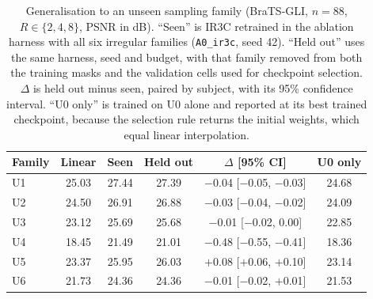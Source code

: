 \begin{table}[pos=t]
\caption{Generalisation to an unseen sampling family (BraTS-GLI, $n=88$, $R\in\{2,4,8\}$, PSNR in dB). ``Seen'' is IR3C retrained in the ablation harness with all six irregular families (\texttt{A0\_ir3c}, seed 42). ``Held out'' uses the same harness, seed and budget, with that family removed from both the training masks and the validation cells used for checkpoint selection. $\Delta$ is held out minus seen, paired by subject, with its 95\% confidence interval. ``U0 only'' is trained on U0 alone and reported at its best trained checkpoint, because the selection rule returns the initial weights, which equal linear interpolation.}
\label{tab:heldout}
\footnotesize\setlength{\tabcolsep}{3pt}
\begin{tabular*}{\columnwidth}{@{\extracolsep{\fill}}lccccc@{}}
\toprule
Family & Linear & Seen & Held out & $\Delta$ [95\% CI] & U0 only \\
\midrule
U1 & 25.03 & 27.44 & 27.39 & $-$0.04 [$-$0.05, $-$0.03] & 24.68 \\
U2 & 24.50 & 26.91 & 26.88 & $-$0.03 [$-$0.04, $-$0.02] & 24.09 \\
U3 & 23.12 & 25.69 & 25.68 & $-$0.01 [$-$0.02, 0.00] & 22.85 \\
U4 & 18.45 & 21.49 & 21.01 & $-$0.48 [$-$0.55, $-$0.41] & 18.36 \\
U5 & 23.37 & 25.95 & 26.03 & $+$0.08 [$+$0.06, $+$0.10] & 23.14 \\
U6 & 21.73 & 24.36 & 24.36 & $-$0.01 [$-$0.02, $+$0.01] & 21.53 \\
\bottomrule
\end{tabular*}
\end{table}
